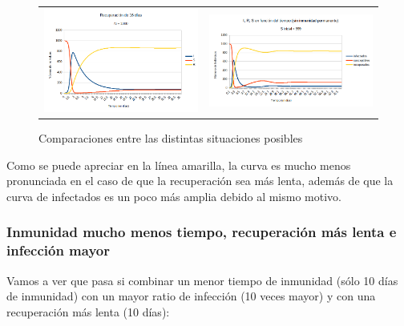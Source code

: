 \documentclass[11pt,a4paper]{report}
\begin{document}
\begin{figure}[H]
\begin{tabular}{ll}
\includegraphics[scale=0.25]{img/sin_inmunidad/recuperacion_16dias.png}
&
\includegraphics[scale=0.25]{img/sin_inmunidad/simulacion_ba_mayor.png}
\end{tabular}
\caption{Comparaciones entre las distintas situaciones posibles}
\end{figure}

Como se puede apreciar en la línea amarilla, la curva es mucho menos pronunciada en el caso de que la recuperación sea más lenta, además de que la curva de infectados es un poco más amplia debido al mismo motivo.

\subsubsection{Inmunidad mucho menos tiempo, recuperación más lenta e infección mayor}

Vamos a ver que pasa si combinar un menor tiempo de inmunidad (sólo 10 días de inmunidad) con un mayor ratio de infección (10 veces mayor) y con una recuperación más lenta (10 días):
\end{document}
